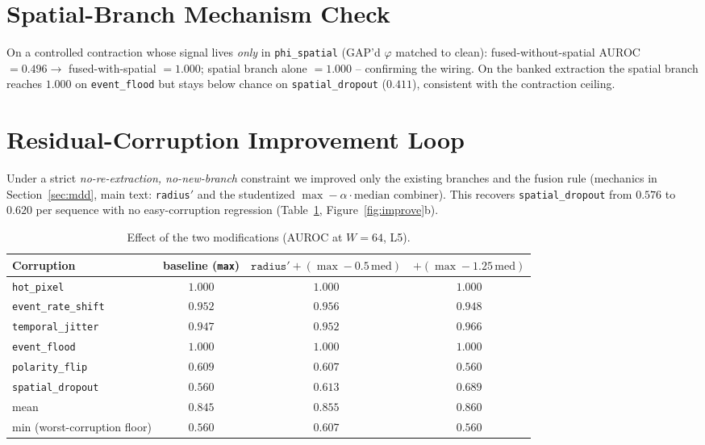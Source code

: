 ﻿\documentclass{article} %
\theoremstyle{remark}
\begin{document}
\section{Spatial-Branch Mechanism Check}
\label{app:spatial-check}
On a controlled contraction whose signal lives \emph{only} in \texttt{phi\_spatial} (GAP'd
$\varphi$ matched to clean): fused-without-spatial AUROC $=0.496\to$ fused-with-spatial $=1.000$;
spatial branch alone $=1.000$ -- confirming the wiring. On the banked extraction the spatial
branch reaches $1.000$ on \texttt{event\_flood} but stays below chance on
\texttt{spatial\_dropout} ($0.411$), consistent with the contraction ceiling.

\section{Residual-Corruption Improvement Loop}
\label{app:mdd-improve}
Under a strict \emph{no-re-extraction, no-new-branch} constraint we improved only the existing
branches and the fusion rule (mechanics in Section~\ref{sec:mdd}, main text: \texttt{radius}$'$ and
the studentized $\max-\alpha\cdot\mathrm{median}$ combiner). This recovers \texttt{spatial\_dropout}
from $0.576$ to $0.620$ per sequence with no easy-corruption regression (Table~\ref{tab:mdd-improve},
Figure~\ref{fig:improve}b).

\begin{table}[t]
  \centering\small
  \caption{Effect of the two modifications (AUROC at $W{=}64$, L5).}
  \label{tab:mdd-improve}
  \begin{tabular}{lccc}
    \toprule
    Corruption & baseline (\texttt{max}) & $\texttt{radius}'+(\max-0.5\,\mathrm{med})$ & $+(\max-1.25\,\mathrm{med})$ \\
    \midrule
    \texttt{hot\_pixel}        & $1.000$ & $1.000$ & $1.000$ \\
    \texttt{event\_rate\_shift}& $0.952$ & $0.956$ & $0.948$ \\
    \texttt{temporal\_jitter}  & $0.947$ & $0.952$ & $0.966$ \\
    \texttt{event\_flood}      & $1.000$ & $1.000$ & $1.000$ \\
    \texttt{polarity\_flip}    & $0.609$ & $0.607$ & $0.560$ \\
    \texttt{spatial\_dropout}  & $0.560$ & $\mathbf{0.613}$ & $\mathbf{0.689}$ \\
    \midrule
    mean                       & $0.845$ & $0.855$ & $0.860$ \\
    min (worst-corruption floor)& $0.560$ & $\mathbf{0.607}$ & $0.560$ \\
    \bottomrule
  \end{tabular}
\end{table}
\end{document}
